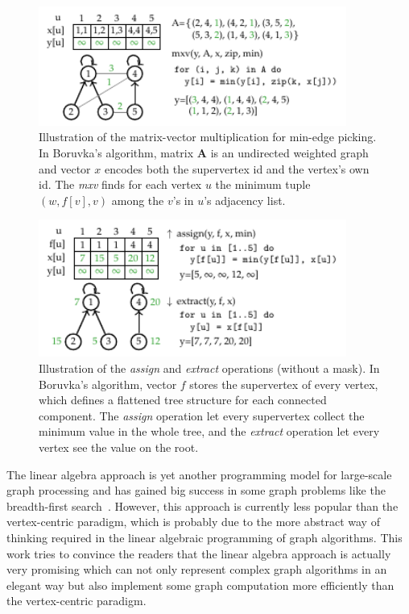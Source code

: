 \documentclass{sokendai_thesis} %
\newcommand{\boruvka}[0]{Boruvka}
\begin{document}
\begin{figure}
\centering
\includegraphics[width=0.9\textwidth]{figures/spmv-msf.pdf}
\caption{Illustration of the matrix-vector multiplication for min-edge picking. In \boruvka{}'s algorithm, matrix $\mathbf{A}$ is an undirected weighted graph and vector $x$ encodes both the supervertex id and the vertex's own id. The \emph{mxv} finds for each vertex $u$ the minimum tuple $(w, f[v], v)$ among the $v$'s in $u$'s adjacency list.}
\label{fig:spmv}
\end{figure}

\begin{figure}
\centering
\includegraphics[width=0.9\textwidth]{figures/assign.pdf}
\caption{Illustration of the \emph{assign} and \emph{extract} operations (without a mask). In \boruvka{}'s algorithm, vector $f$ stores the supervertex of every vertex, which defines a flattened tree structure for each connected component. The \emph{assign} operation let every supervertex collect the minimum value in the whole tree, and the \emph{extract} operation let every vertex see the value on the root.}
\label{fig:assign}
\end{figure}

The linear algebra approach is yet another programming model for large-scale graph processing and has gained big success in some graph problems like the breadth-first search~\cite{graph500}.
However, this approach is currently less popular than the vertex-centric paradigm, which is probably due to the more abstract way of thinking required in the linear algebraic programming of graph algorithms.
This work tries to convince the readers that the linear algebra approach is actually very promising which can not only represent complex graph algorithms in an elegant way but also implement some graph computation more efficiently than the vertex-centric paradigm.
\end{document}
